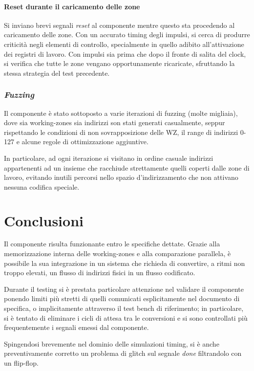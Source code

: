\documentclass[11pt,a4paper]{article}
\begin{document}
\paragraph{Reset durante il caricamento delle zone}
Si inviano brevi segnali \emph{reset} al componente mentre questo sta procedendo al caricamento delle zone. Con un accurato timing degli impulsi, si cerca
di produrre criticità negli elementi di controllo, specialmente in quello adibito all'attivazione dei registri di lavoro. Con impulsi sia prima che dopo
il fronte di salita del clock, si verifica che tutte le zone vengano opportunamente ricaricate, sfruttando la stessa strategia del test precedente.

\subsubsection{\emph{Fuzzing}}
Il componente è stato sottoposto a varie iterazioni di fuzzing (molte migliaia), dove sia working-zones sia indirizzi son stati generati casualmente,
seppur rispettando le condizioni di non sovrapposizione delle WZ, il range di indirizzi 0-127 e alcune regole di ottimizzazione aggiuntive.

In particolare, ad ogni iterazione si visitano in ordine casuale indirizzi appartenenti ad un insieme che racchiude strettamente quelli coperti dalle
zone di lavoro, evitando inutili percorsi nello spazio d'indirizzamento che non attivano nessuna codifica speciale.

\section{Conclusioni}
Il componente risulta funzionante entro le specifiche dettate. Grazie alla memorizzazione interna delle working-zones e alla comparazione parallela, è
possibile la sua integrazione in un sistema che richieda di convertire, a ritmi non troppo elevati, un flusso di indirizzi fisici in un flusso codificato.

Durante il testing si è prestata particolare attenzione nel validare il componente ponendo limiti più stretti di quelli comunicati esplicitamente nel
documento di specifica, o implicitamente attraverso il test bench di riferimento; in particolare, si è tentato di eliminare i cicli di attesa tra le
conversioni e si sono controllati più frequentemente i segnali emessi dal componente.

Spingendosi brevemente nel dominio delle simulazioni timing, si è anche preventivamente corretto un problema di glitch sul segnale \emph{done} filtrandolo
con un flip-flop.
\end{document}
